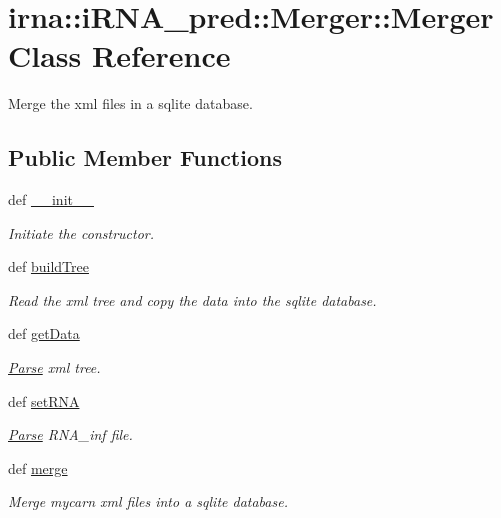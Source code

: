 \hypertarget{classirna_1_1iRNA__pred_1_1Merger_1_1Merger}{
\section{irna\-:\-:i\-R\-N\-A\-\_\-pred\-:\-:\-Merger\-:\-:\-Merger \-Class \-Reference}
\label{classirna_1_1iRNA__pred_1_1Merger_1_1Merger}
}


\-Merge the xml files in a sqlite database.  


\subsection*{\-Public \-Member \-Functions}
\begin{DoxyCompactItemize}
\item 
def \hyperlink{classirna_1_1iRNA__pred_1_1Merger_1_1Merger_abd0b8f8b66883163fed46bc2e4ef85d2}{\-\_\-\-\_\-init\-\_\-\-\_\-}
\begin{DoxyCompactList}\small\item\em \-Initiate the constructor. \end{DoxyCompactList}\item 
def \hyperlink{classirna_1_1iRNA__pred_1_1Merger_1_1Merger_abab2e55be9532a718f8caebf6545a7ab}{build\-Tree}
\begin{DoxyCompactList}\small\item\em \-Read the xml tree and copy the data into the sqlite database. \end{DoxyCompactList}\item 
def \hyperlink{classirna_1_1iRNA__pred_1_1Merger_1_1Merger_aad2bf9d952bfb24750e992ae561413ab}{get\-Data}
\begin{DoxyCompactList}\small\item\em \hyperlink{namespaceirna_1_1iRNA__pred_1_1Parse}{\-Parse} xml tree. \end{DoxyCompactList}\item 
def \hyperlink{classirna_1_1iRNA__pred_1_1Merger_1_1Merger_a34d637e86420774f9ef883a30431774a}{set\-R\-N\-A}
\begin{DoxyCompactList}\small\item\em \hyperlink{namespaceirna_1_1iRNA__pred_1_1Parse}{\-Parse} \-R\-N\-A\-\_\-inf file. \end{DoxyCompactList}\item 
def \hyperlink{classirna_1_1iRNA__pred_1_1Merger_1_1Merger_a8f11d43f13cf8b846282313a51296179}{merge}
\begin{DoxyCompactList}\small\item\em \-Merge mycarn xml files into a sqlite database. \end{DoxyCompactList}\end{DoxyCompactItemize}
